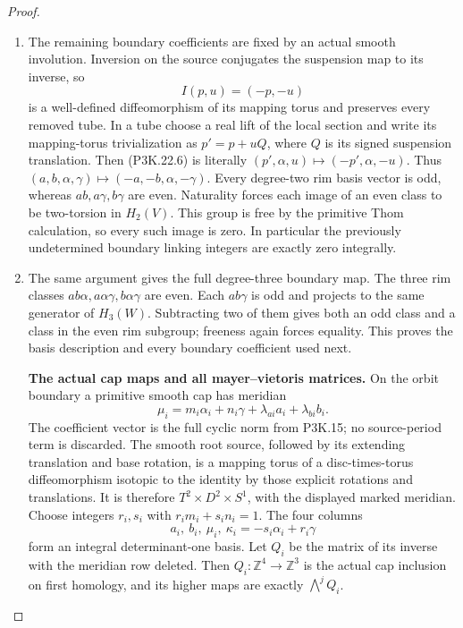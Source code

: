 \begin{proof}
\begin{enumerate}[label=\arabic*.]
\item The remaining boundary coefficients are fixed by an actual smooth
involution.  Inversion on the source conjugates the suspension map
to its inverse, so
\[
                         I(p,u)=(-p,-u)                         \tag{P3K.22.6}
\]
is a well-defined diffeomorphism of its mapping torus and preserves
every removed tube.  In a tube choose a real lift of the local
section and write its mapping-torus trivialization as
\(p'=p+uQ\), where \(Q\) is its signed suspension translation.
Then (P3K.22.6) is literally \((p',\alpha,u)\mapsto(-p',\alpha,-u)\).
Thus \((a,b,\alpha,\gamma)\mapsto(-a,-b,\alpha,-\gamma)\).
Every degree-two rim basis vector is odd, whereas
\(ab,a\gamma,b\gamma\) are even.  Naturality forces each image
of an even class to be two-torsion in \(H_2(V)\).  This group is
free by the primitive Thom calculation, so every such image is zero.
In particular the previously undetermined boundary linking integers
are exactly zero integrally.

\item The same argument gives the full degree-three boundary map.
The three rim classes \(ab\alpha,a\alpha\gamma,b\alpha\gamma\)
are even.  Each \(ab\gamma\) is odd and projects to the same
generator of \(H_3(W)\).  Subtracting two of them gives both an
odd class and a class in the even rim subgroup; freeness again
forces equality.  This proves the basis description and every
boundary coefficient used next.

\par\medskip\noindent\textbf{The actual cap maps and all mayer--vietoris matrices.}\enspace
On the orbit boundary a primitive smooth cap has meridian
\[
 \mu_i=m_i\alpha_i+n_i\gamma+\lambda_{ai}a_i+\lambda_{bi}b_i.
\]
The coefficient vector is the full cyclic norm from P3K.15; no
source-period term is discarded.  The smooth root source, followed
by its extending translation and base rotation, is a mapping torus
of a disc-times-torus diffeomorphism isotopic to the identity by
those explicit rotations and translations.  It is therefore
\(T^2\times D^2\times S^1\), with the displayed marked meridian.
Choose integers \(r_i,s_i\) with \(r_im_i+s_in_i=1\).
The four columns
\[
 a_i,\ b_i,\ \mu_i,\ \kappa_i=-s_i\alpha_i+r_i\gamma
\]
form an integral determinant-one basis.  Let \(Q_i\) be the
matrix of its inverse with the meridian row deleted.  Then
\(Q_i:\mathbb Z^4\to\mathbb Z^3\) is the actual cap inclusion
on first homology, and its higher maps are exactly
\(\bigwedge^jQ_i\).


\end{enumerate}
\end{proof}
